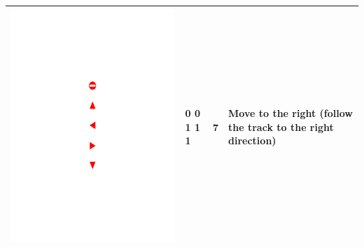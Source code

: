 \documentclass[a4paper,twoside]{article}
\begin{document}
\begin{table}[!h]
\begin{tabular}{|C{1.3cm}|C{1.3cm}|C{1.3cm}|C{2cm}|}
		\begin{minipage}{.075\textwidth}\includegraphics[scale=.5,trim=9.1cm 10.75cm 9.5cm 15.75cm,clip]{signs.pdf}\end{minipage}	& 0 0 1 1 1 & 7 & Move to the right (follow the track to the right direction) \\ \hline

\end{tabular}
\end{table}
\end{document}
